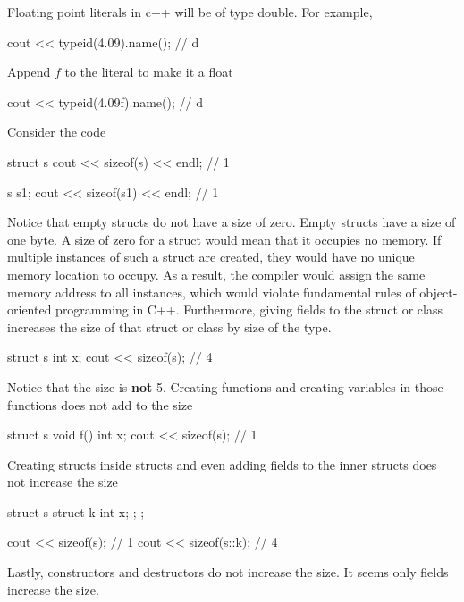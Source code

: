 \documentclass{report}
\begin{document}
    \pagebreak 
    \bigbreak \noindent 
    Floating point literals in c++ will be of type double. For example,
    \bigbreak \noindent 
    \begin{cppcode}
    cout << typeid(4.09).name(); // d
    \end{cppcode}
    \bigbreak \noindent 
    Append $f$ to the literal to make it a float
    \bigbreak \noindent 
    \begin{cppcode}
        cout << typeid(4.09f).name(); // d
    \end{cppcode}

    \pagebreak 
    \bigbreak \noindent 
    Consider the code
    \bigbreak \noindent 
    \begin{cppcode}
        struct s { }
        cout << sizeof(s) << endl; // 1

        s s1;
        cout << sizeof(s1) << endl; // 1
    \end{cppcode}
    Notice that empty structs do not have a size of zero. Empty structs have a size of one byte. 
    \bigbreak \noindent 
    A size of zero for a struct would mean that it occupies no memory. If multiple instances of such a struct are created, they would have no unique memory location to occupy. As a result, the compiler would assign the same memory address to all instances, which would violate fundamental rules of object-oriented programming in C++.
    \bigbreak \noindent 
    Furthermore, giving fields to the struct or class increases the size of that struct or class by size of the type. 
    \bigbreak \noindent 
    \begin{cppcode}
        struct s { int x; }
        cout << sizeof(s); // 4
    \end{cppcode}
    \bigbreak \noindent 
    Notice that the size is \textbf{not} 5. Creating functions and creating variables in those functions does not add to the size
    \bigbreak \noindent 
    \begin{cppcode}
        struct s {
            void f()  {
                int  x;
            }
        }
        cout << sizeof(s); // 1
    \end{cppcode}
    \bigbreak \noindent 
    Creating structs inside structs and even adding fields to the inner structs does not increase the size
    \bigbreak \noindent 
    \begin{cppcode}
    struct s {
        struct k { int x; };
    };

    cout << sizeof(s); // 1
    cout << sizeof(s::k); // 4
    \end{cppcode}
    \bigbreak \noindent 
    Lastly, constructors and destructors do not increase the size.
    \bigbreak \noindent 
    It seems only fields increase the size.
\end{document}
